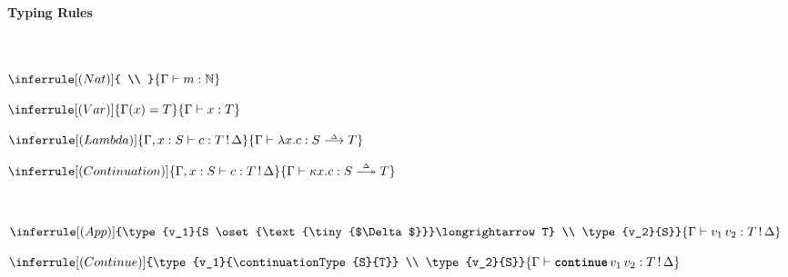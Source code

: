 \begin{figure}
  \begin{eff-desc}
    {\large\textbf{Typing Rules}}\\
    \vspace{2mm}\\
    \\
    \begin{center}
    \begin{minipage}[t]{0.2\textwidth}
      \centering
      $\inferrule[(Nat)]
      { \\ }
      {\type{m}{\mathbb{N}}}$
      \end{minipage}%
  \begin{minipage}[t]{0.2\textwidth}
    \centering
  $\inferrule[(Var)]
  {\Gamma(x) = T}
  {\type{x}{T}}$
  \end{minipage}%
  \begin{minipage}[t]{0.3\textwidth}
    \centering
  $\inferrule[(Lambda)]
    {\type[, x:S]{c}{\effectType{T}}}
    {\type{\function{x}{c}}{\functionType{S}{T}}}$
  \end{minipage}%
  \begin{minipage}[t]{0.3\textwidth}
  \centering
$\inferrule[(Continuation)]
  {\type[, x:S]{c}{\effectType{T}}}
  {\type{\continuation{x}{c}}{\continuationType{S}{T}}}$
\end{minipage}  
  \vspace{5mm}

\end{center}
  
  \\
  \begin{center}
    
  \begin{minipage}[t]{0.5\textwidth}
    \centering
  $\inferrule[(App)]
    {\type{v_1}{S \oset{\text{\tiny{$\Delta$}}}\longrightarrow T} \\ \type{v_2}{S}}
    {\type{v_1 \, v_2}{\effectType{T}}}$
  \end{minipage}%
  \begin{minipage}[t]{0.5\textwidth}
    \centering
  $\inferrule[(Continue)]
    {\type{v_1}{\continuationType{S}{T}} \\ \type{v_2}{S}}
    {\type{\continue{v_1}{v_2}}{\effectType{T}}}$
  \end{minipage}

  \vspace{5mm}


\end{center}
\end{eff-desc}
\end{figure}
